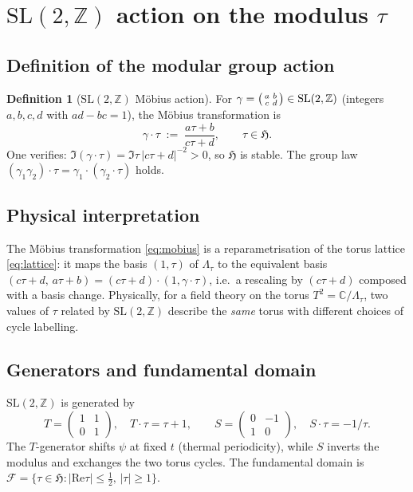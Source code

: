 \documentclass[12pt,a4paper]{article}
\theoremstyle{definition}
\newtheorem{definition}[theorem]{Definition}
\theoremstyle{remark}
\newcommand{\SL}{\mathrm{SL}}
\newcommand{\ZZ}{\mathbb{Z}}
\newcommand{\HH}{\mathfrak{H}}
\newcommand{\CC}{\mathbb{C}}
\newcommand{\Real}{\mathrm{Re}}
\begin{document}
\section{$\SL(2,\ZZ)$ action on the modulus $\tau$}
\label{sec:SL2Z}

\subsection{Definition of the modular group action}

\begin{definition}[$\SL(2,\ZZ)$ Möbius action]
\label{def:SL2Z}
For $\gamma=\begin{psmallmatrix}a&b\\c&d\end{psmallmatrix}\in\SL(2,\ZZ)$
(integers $a,b,c,d$ with $ad-bc=1$), the Möbius transformation is
\begin{equation}
  \gamma\cdot\tau \;:=\; \frac{a\tau+b}{c\tau+d},
  \qquad \tau\in\HH.
  \label{eq:mobius}
\end{equation}
One verifies: $\Im(\gamma\cdot\tau)=\Im\tau\,|c\tau+d|^{-2}>0$, so
$\HH$ is stable.  The group law $(\gamma_1\gamma_2)\cdot\tau=\gamma_1\cdot(\gamma_2\cdot\tau)$
holds.
\end{definition}

\subsection{Physical interpretation}

The Möbius transformation \eqref{eq:mobius} is a reparametrisation of the
torus lattice \eqref{eq:lattice}: it maps the basis $(1,\tau)$ of $\Lambda_\tau$
to the equivalent basis $(c\tau+d,\,a\tau+b)=(c\tau+d)\cdot(1,\gamma\cdot\tau)$,
i.e.\ a rescaling by $(c\tau+d)$ composed with a basis change.  Physically,
for a field theory on the torus $T^2=\CC/\Lambda_\tau$, two values of $\tau$
related by $\SL(2,\ZZ)$ describe the \emph{same} torus with different choices
of cycle labelling.

\subsection{Generators and fundamental domain}

$\SL(2,\ZZ)$ is generated by
\begin{equation}
  T = \begin{pmatrix}1&1\\0&1\end{pmatrix},
  \quad T\cdot\tau = \tau+1,
  \qquad
  S = \begin{pmatrix}0&-1\\1&0\end{pmatrix},
  \quad S\cdot\tau = -1/\tau.
  \label{eq:generators}
\end{equation}
The $T$-generator shifts $\psi$ at fixed $t$ (thermal periodicity), while
$S$ inverts the modulus and exchanges the two torus cycles.
The fundamental domain is
$\mathcal F=\{\tau\in\HH:|\Real\tau|\le\tfrac12,\,|\tau|\ge1\}$.
\end{document}
